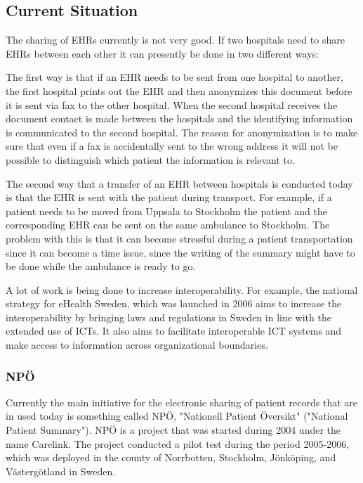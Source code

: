 \documentclass[14pt]{article}
\begin{document}
\subsection{Current Situation} %
\label{sec:interopCurrent}

The sharing of \glspl{EHR} currently is not very good. If two hospitals need to share \glspl{EHR} between each other it can presently be done in two different ways: \cite{EPJ2}

The first way is that if an \gls{EHR} needs to be sent from one hospital to another, the first hospital prints out the \gls{EHR} and then anonymizes this document before it is sent via fax to the other hospital. When the second hospital receives the document contact is made between the hospitals and the identifying information is communicated to the second hospital. \cite{EPJ2} The reason for anonymization is to make sure that even if a fax is accidentally sent to the wrong address it will not be possible to distinguish which patient the information is relevant to. \cite{EPJ2}

The second way that a transfer of an \gls{EHR} between hospitals is conducted today is that the \gls{EHR} is sent with the patient during transport. For example, if a patient needs to be moved from Uppsala to Stockholm the patient and the corresponding \gls{EHR} can be sent on the same ambulance to Stockholm\cite{EPJ2}. The problem with this is that it can become stressful during a patient transportation since it can become a time issue, since the writing of the summary might have to be done while the ambulance is ready to go\cite{EPJ2}.


A lot of work is being done to increase \gls{interoperability}. For example, the national strategy for eHealth Sweden, which was launched in 2006 aims to increase the interoperability by bringing laws and regulations in Sweden in line with the extended use of \glspl{ICT}. It also aims to facilitate interoperable \gls{ICT} systems and make access to information across organizational boundaries. \cite{NationalStrategy} 

\subsubsection{NPÖ} %
Currently the main initiative for the electronic sharing of patient records that are in used today is something called NPÖ, "Nationell Patient Översikt" ("National Patient Summary"). NPÖ is a project that was started during 2004 under the name Carelink\cite{ViktorJernelov}. The project conducted a pilot test during the period 2005-2006, which was deployed in the county of Norrbotten, Stockholm, Jönköping, and Västergötland in Sweden.
\end{document}
